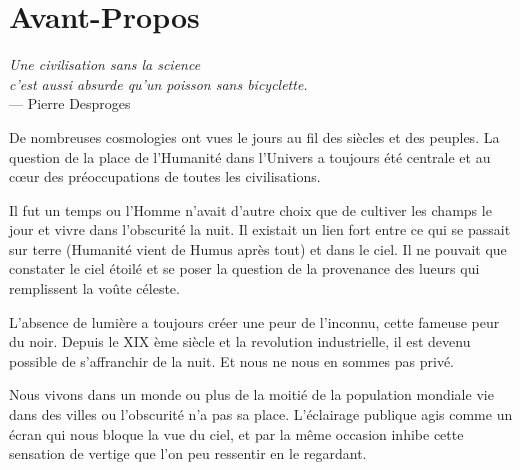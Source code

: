 
\chapter*{Avant-Propos}

\begin{flushright}{\slshape    
	Une civilisation sans la science \\
	c'est aussi absurde qu'un poisson sans bicyclette.} \\ \medskip 
	--- Pierre Desproges
\end{flushright}


De nombreuses cosmologies ont vues le jours au fil des siècles et des peuples.
La question de la place de l'Humanité dans l'Univers a toujours été centrale et au cœur des préoccupations de toutes les civilisations.

Il fut un temps ou l'Homme n'avait d'autre choix que de cultiver les champs le jour et vivre dans l'obscurité la nuit.
Il existait un lien fort entre ce qui se passait sur terre (Humanité vient de Humus après tout) et dans le ciel.
Il ne pouvait que constater le ciel étoilé et se poser la question de la provenance des lueurs qui remplissent la voûte céleste.

L’absence de lumière a toujours créer une peur de l'inconnu, cette fameuse peur du noir.
Depuis le XIX ème siècle et la revolution industrielle, il est devenu possible de s'affranchir de la nuit.
Et nous ne nous en sommes pas privé.

Nous vivons dans un monde ou plus de la moitié de la population mondiale vie dans des villes ou l'obscurité n'a pas sa place.
L’éclairage publique agis comme un écran qui nous bloque la vue du ciel, et par la même occasion inhibe cette sensation de vertige que l'on peu ressentir en le regardant.

